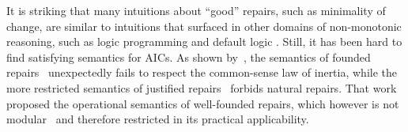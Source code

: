 
It is striking that many intuitions about ``good'' repairs, such as minimality of change, are similar to intuitions that surfaced in other domains of non-monotonic reasoning, such as logic programming  and default logic . 
Still, it has been hard to find satisfying semantics for AICs.
As shown by~\citet{tase/Cruz-FilipeEGN13}, the semantics of founded repairs~\cite{iclp/CaropreseGSZ06} unexpectedly fails to respect the common-sense law of inertia, while the more restricted semantics of justified repairs~\cite{tplp/CaropreseT11} forbids natural repairs.
That work proposed the operational semantics of well-founded repairs, which however is not modular~\cite{foiks/Cruz-Filipe14} and therefore restricted in its practical applicability.



